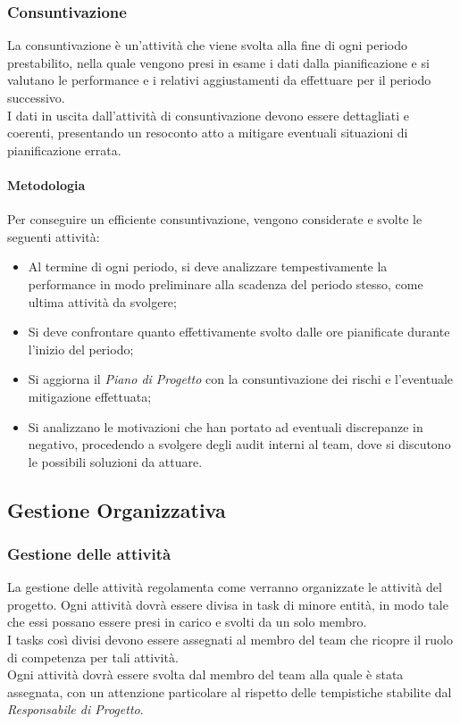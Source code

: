		\subsubsection{Consuntivazione}
		La consuntivazione è un'attività che viene svolta alla fine di ogni periodo prestabilito, nella quale vengono presi in esame i dati dalla pianificazione e si valutano le performance e i relativi aggiustamenti da effettuare per il periodo successivo.\\
		I dati in uscita dall'attività di consuntivazione devono essere dettagliati e coerenti, presentando un resoconto atto a mitigare eventuali situazioni di pianificazione errata.
		
		\paragraph{Metodologia}
		Per conseguire un efficiente consuntivazione, vengono considerate e svolte le seguenti attività:
		
		\begin{itemize}
			\item Al termine di ogni periodo, si deve analizzare tempestivamente la performance in modo preliminare alla scadenza del periodo stesso, come ultima attività da svolgere;
			\item Si deve confrontare quanto effettivamente svolto dalle ore pianificate durante l'inizio del periodo;
			\item Si aggiorna il \textit{Piano di Progetto} con la consuntivazione dei rischi e l'eventuale mitigazione effettuata;
			\item Si analizzano le motivazioni che han portato ad eventuali discrepanze in negativo, procedendo a svolgere degli audit interni al team, dove si discutono le possibili soluzioni da attuare.
		\end{itemize}
	
	\newpage	
	\subsection{Gestione Organizzativa}
		\subsubsection{Gestione delle attività}
		La gestione delle attività regolamenta come verranno organizzate le attività del progetto. Ogni attività dovrà essere divisa in task di minore entità, in modo tale che essi possano essere presi in carico e svolti da un solo membro.\\
		I tasks così divisi devono essere assegnati al membro del team che ricopre il ruolo di competenza per tali attività.\\
		Ogni attività dovrà essere svolta dal membro del team alla quale è stata assegnata, con un attenzione particolare al rispetto delle tempistiche stabilite dal \textit{Responsabile di Progetto}.
		
